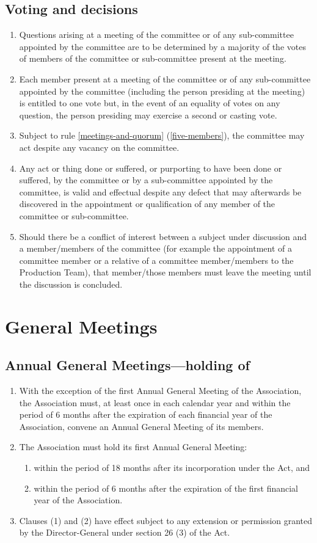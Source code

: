 \documentclass{article}
\begin{document}
\subsection{Voting and decisions}
\begin{enumerate}
  \item Questions arising at a meeting of the committee or of any sub-committee appointed by the committee are to be determined by a majority of the votes of members of the committee or sub-committee present at the meeting.
  \item Each member present at a meeting of the committee or of any sub-committee appointed by the committee (including the person presiding at the meeting) is entitled to one vote but, in the event of an equality of votes on any question, the person presiding may exercise a second or casting vote.
  \item Subject to rule \ref{meetings-and-quorum} (\ref{five-members}), the committee may act despite any vacancy on the committee.
  \item Any act or thing done or suffered, or purporting to have been done or suffered, by the committee or by a sub-committee appointed by the committee, is valid and effectual despite any defect that may afterwards be discovered in the appointment or qualification of any member of the committee or sub-committee.
  \item Should there be a conflict of interest between a subject under discussion and a member/members of the committee (for example the appointment of a committee member or a relative of a committee member/members to the Production Team), that member/those members must leave the meeting until the discussion is concluded.
\end{enumerate}
\section{General Meetings}
\subsection{Annual General Meetings—holding of}
\begin{enumerate}
  \item With the exception of the first Annual General Meeting of the Association, the Association must, at least once in each calendar year and within the period of 6 months after the expiration of each financial year of the Association, convene an Annual General Meeting of its members.
  \item The Association must hold its first Annual General Meeting:
    \begin{enumerate}
      \item within the period of 18 months after its incorporation under the Act, and
      \item within the period of 6 months after the expiration of the first financial year of the Association.
    \end{enumerate}
  \item Clauses (1) and (2) have effect subject to any extension or permission granted by the Director-General under section 26 (3) of the Act.
\end{enumerate}
\end{document}
